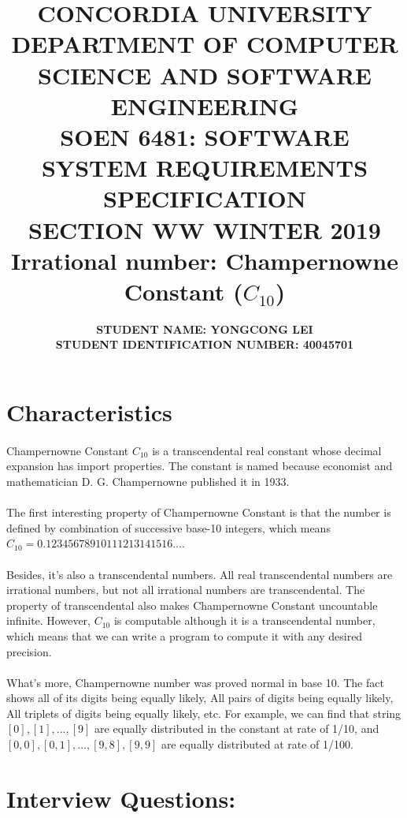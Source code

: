 \documentclass[10pt]{article}
\title{{\large \textbf{CONCORDIA UNIVERSITY \\ DEPARTMENT OF COMPUTER SCIENCE AND SOFTWARE ENGINEERING \\ SOEN 6481: SOFTWARE SYSTEM REQUIREMENTS SPECIFICATION \\ SECTION WW WINTER 2019 \\ Irrational number: Champernowne Constant ($C_{10}$)}  \\ }}
\author{\normalsize \textbf {STUDENT NAME: YONGCONG LEI} \\ \normalsize \textbf{STUDENT IDENTIFICATION NUMBER: 40045701 }}
\date{}
\begin{document}
\maketitle

\section*{\normalsize \textbf{Characteristics}}
\paragraph{}
Champernowne Constant $C_{10}$ is a transcendental real constant whose decimal expansion has import properties. The constant is named because economist and mathematician D. G. Champernowne published it in 1933.

\paragraph{}
The first interesting property of Champernowne Constant is that the number is defined by combination of successive base-10 integers, which means $C_{10} = 0.12345678910111213141516…$.

\paragraph{}
Besides, it's also a transcendental numbers. All real transcendental numbers are irrational numbers, but not all irrational numbers are transcendental. The property of transcendental also makes Champernowne Constant uncountable infinite. However, $C_{10}$ is computable  although it is a transcendental number, which means that we can write a program to compute it with any desired precision.

\paragraph{}
What's more, Champernowne number was proved normal in base 10. The fact shows all of its digits being equally likely, All pairs of digits being equally likely, All triplets of digits being equally likely, etc. For example, we can find that string $[0], [1], ..., [9]$ are equally distributed in the constant at rate of 1/10, and $ [0,0],[0,1],...,[9,8],[9,9]$ are equally distributed at rate of 1/100.





\section*{\normalsize \textbf{Interview Questions:}}
\end{document}
